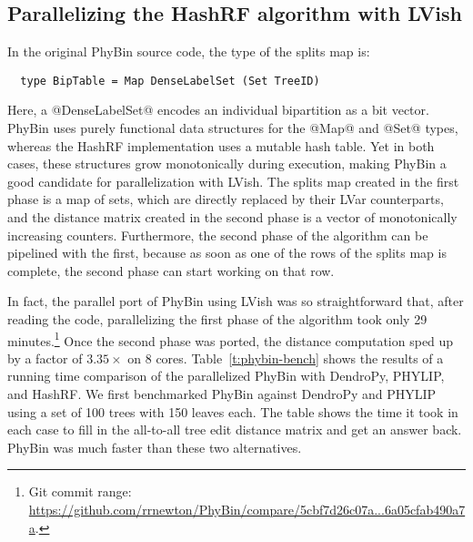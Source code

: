 \subsection{Parallelizing the HashRF algorithm with LVish}

In the original PhyBin source code, the type of the splits map is:

\singlespacing
\begin{lstlisting}
  type BipTable = Map DenseLabelSet (Set TreeID)
\end{lstlisting}
\doublespacing

Here, a @DenseLabelSet@ encodes an individual bipartition as a bit
vector.  PhyBin uses purely functional data structures for the @Map@
and @Set@ types, whereas the HashRF implementation uses a mutable hash
table.  Yet in both cases, these structures grow monotonically during
execution, making PhyBin a good candidate for parallelization with
LVish.  The splits map created in the first phase is a map of sets,
which are directly replaced by their LVar counterparts, and the
distance matrix created in the second phase is a vector of
monotonically increasing counters.  Furthermore, the second phase of
the algorithm can be pipelined with the first, because as soon as one
of the rows of the splits map is complete, the second phase can start
working on that row.

In fact, the parallel port of PhyBin using LVish was so
straightforward that, after reading the code, parallelizing the first
phase of the algorithm took only 29 minutes.\footnote{Git commit
  range:
  \url{https://github.com/rrnewton/PhyBin/compare/5cbf7d26c07a...6a05cfab490a7a}.}
Once the second phase was ported, the distance computation sped up by
a factor of $3.35\times$ on 8 cores. Table~\ref{t:phybin-bench} shows
the results of a running time comparison of the parallelized PhyBin
with DendroPy, PHYLIP, and HashRF.  We first benchmarked PhyBin
against DendroPy and PHYLIP using a set of 100 trees with 150 leaves
each.  The table shows the time it took in each case to fill in the
all-to-all tree edit distance matrix and get an answer back.  PhyBin
was much faster than these two alternatives.

